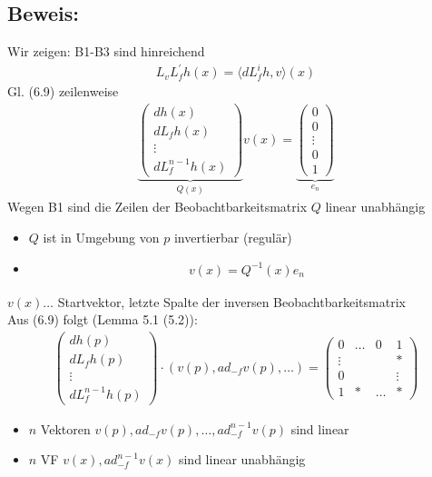 \documentclass[ngerman]{tudscrreprt}
\begin{document}
\subsection*{Beweis:} Wir zeigen: B1-B3 sind hinreichend\begin{align*}
L_vL_f^{'}h(x) = \langle dL_f^i h, v \rangle (x)
\end{align*}Gl. (6.9) zeilenweise
\begin{align*}\underbrace{\begin{pmatrix}
dh(x)\\ dL_fh(x)\\ 
\vdots\\ dL_f^{n-1}h(x)
\end{pmatrix}}_{Q(x)} v(x) = \underbrace{\begin{pmatrix} 0\\ 0\\ \vdots\\ 0\\ 1\end{pmatrix}}_{e_n}\tag{6.10}
\end{align*}
Wegen B1 sind die Zeilen der Beobachtbarkeitsmatrix $Q$ linear unabhängig \begin{itemize}
\item $Q$ ist in Umgebung von $p$ invertierbar (regulär)
\item \begin{align*}v(x) = Q^{-1}(x) e_n   \tag{6.11} \end{align*}
\end{itemize}
$v(x)\dots$ Startvektor, letzte Spalte der inversen Beobachtbarkeitsmatrix\\ 
Aus (6.9) folgt (Lemma 5.1 (5.2)): \begin{align*}
\begin{pmatrix}
dh(p)\\ dL_fh(p)\\ \vdots\\ dL_f^{n-1}h(p)
\end{pmatrix}\cdot (v(p), ad_{-f}v(p),\dots) = \begin{pmatrix}
0 & \dots & 0 & 1\\ 
\vdots & &&*\\ 
0 &&&\vdots\\ 
1& * &\dots& *
\end{pmatrix}\tag{6.12}
\end{align*} 
\begin{itemize}
\item $n$ Vektoren $v(p), ad_{-f}v(p), \dots, ad_{-f}^{n-1}v(p)$ sind linear
\item $n$ VF $v(x), ad_{-f}^{n-1}v(x)$ sind linear unabhängig   
\end{itemize}
\end{document}
